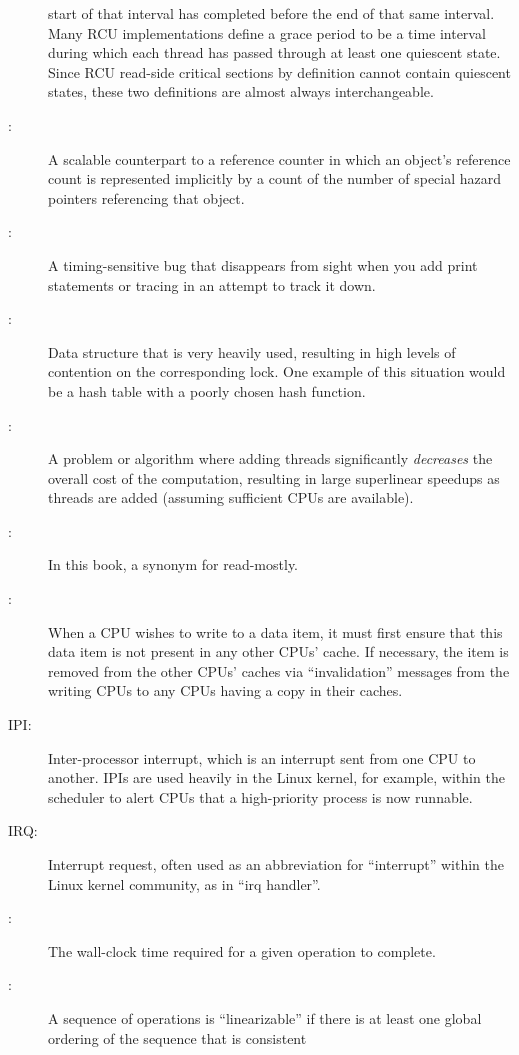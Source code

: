 \begin{description}
	start of that interval has
	completed before the end of that same interval.
	Many RCU implementations define a grace period to be a
	time interval during which each thread has passed through at
	least one quiescent state.
	Since RCU read-side critical sections by definition cannot
	contain quiescent states, these two definitions are almost
	always interchangeable.
\item[\IX{Hazard Pointer}:]
	A scalable counterpart to a reference counter in which an
	object's reference count is represented implicitly by a count
	of the number of special hazard pointers referencing that object.
\item[\IX{Heisenbug}:]
	A timing-sensitive bug that disappears from sight when you
	add print statements or tracing in an attempt to track it
	down.
\item[\IX{Hot Spot}:]
	Data structure that is very heavily used, resulting in high
	levels of contention on the corresponding lock.
	One example of this situation would be a hash table with
	a poorly chosen hash function.
\item[\IX{Humiliatingly Parallel}:]
	A problem or algorithm where adding threads significantly
	\emph{decreases} the overall cost of the computation, resulting in
	large superlinear speedups as threads are added (assuming sufficient
	CPUs are available).
\item[\IX{Immutable}:]
	In this book, a synonym for read-mostly.
\item[\IX{Invalidation}:]
	When a CPU wishes to write to a data item, it must first ensure
	that this data item is not present in any other CPUs' cache.
	If necessary, the item is removed from the other CPUs' caches
	via ``invalidation'' messages from the writing CPUs to any
	CPUs having a copy in their caches.
\item[IPI:]
	Inter-processor interrupt, which is an
	interrupt sent from one CPU to another.
	IPIs are used heavily in the Linux kernel, for example, within
	the scheduler to alert CPUs that a high-priority process is now
	runnable.
\item[IRQ:]
	Interrupt request, often used as an abbreviation for ``interrupt''
	within the Linux kernel community, as in ``irq handler''.
\item[\IX{Latency}:]
	The wall-clock time required for a given operation to complete.
\item[\IX{Linearizable}:]
	A sequence of operations is ``linearizable'' if there is at
	least one global ordering of the sequence that is consistent

\end{description}
